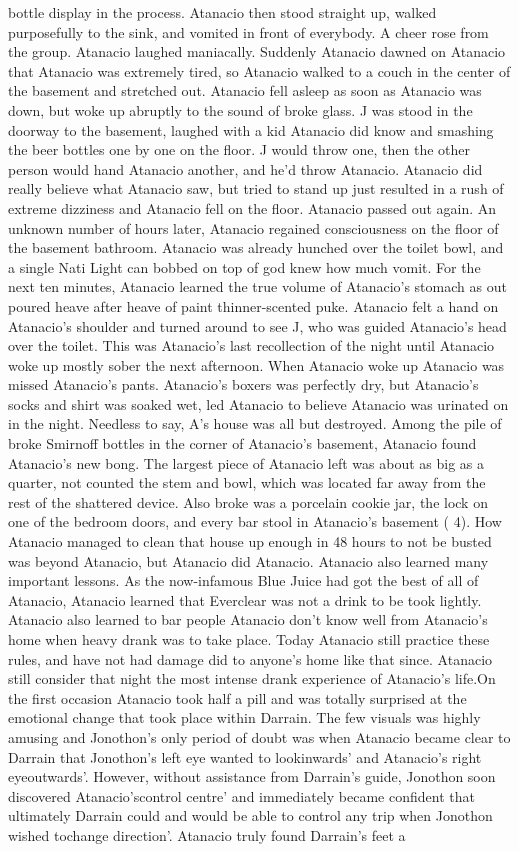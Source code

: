 \documentclass[12pt]{book}
\begin{document}
bottle display in the process. Atanacio then stood straight up, walked purposefully to the sink, and vomited in front of everybody. A cheer rose from the group. Atanacio laughed maniacally. Suddenly Atanacio dawned on Atanacio that Atanacio was extremely tired, so Atanacio walked to a couch in the center of the basement and stretched out. Atanacio fell asleep as soon as Atanacio was down, but woke up abruptly to the sound of broke glass. J was stood in the doorway to the basement, laughed with a kid Atanacio did know and smashing the beer bottles one by one on the floor. J would throw one, then the other person would hand Atanacio another, and he'd throw Atanacio. Atanacio did really believe what Atanacio saw, but tried to stand up just resulted in a rush of extreme dizziness and Atanacio fell on the floor. Atanacio passed out again. An unknown number of hours later, Atanacio regained consciousness on the floor of the basement bathroom. Atanacio was already hunched over the toilet bowl, and a single Nati Light can bobbed on top of god knew how much vomit. For the next ten minutes, Atanacio learned the true volume of Atanacio's stomach as out poured heave after heave of paint thinner-scented puke. Atanacio felt a hand on Atanacio's shoulder and turned around to see J, who was guided Atanacio's head over the toilet. This was Atanacio's last recollection of the night until Atanacio woke up mostly sober the next afternoon. When Atanacio woke up Atanacio was missed Atanacio's pants. Atanacio's boxers was perfectly dry, but Atanacio's socks and shirt was soaked wet, led Atanacio to believe Atanacio was urinated on in the night. Needless to say, A's house was all but destroyed. Among the pile of broke Smirnoff bottles in the corner of Atanacio's basement, Atanacio found Atanacio's new bong. The largest piece of Atanacio left was about as big as a quarter, not counted the stem and bowl, which was located far away from the rest of the shattered device. Also broke was a porcelain cookie jar, the lock on one of the bedroom doors, and every bar stool in Atanacio's basement ( 4). How Atanacio managed to clean that house up enough in 48 hours to not be busted was beyond Atanacio, but Atanacio did Atanacio. Atanacio also learned many important lessons. As the now-infamous Blue Juice had got the best of all of Atanacio, Atanacio learned that Everclear was not a drink to be took lightly. Atanacio also learned to bar people Atanacio don't know well from Atanacio's home when heavy drank was to take place. Today Atanacio still practice these rules, and have not had damage did to anyone's home like that since. Atanacio still consider that night the most intense drank experience of Atanacio's life.On the first occasion Atanacio took half a pill and was totally surprised at the emotional change that took place within Darrain. The few visuals was highly amusing and Jonothon's only period of doubt was when Atanacio became clear to Darrain that Jonothon's left eye wanted to lookinwards' and Atanacio's right eyeoutwards'. However, without assistance from Darrain's guide, Jonothon soon discovered Atanacio'scontrol centre' and immediately became confident that ultimately Darrain could and would be able to control any trip when Jonothon wished tochange direction'. Atanacio truly found Darrain's feet a 
\end{document}
